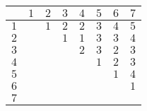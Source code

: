 \begin{tabular}{c|ccccccc}
\toprule
&$1$&$2$&$3$&$4$&$5$&$6$&$7$\\
\midrule
$1$&   &$1$&$2$&$2$&$3$&$4$&$5$\\
$2$&   &   &$1$&$1$&$3$&$3$&$4$\\
$3$&   &   &   &$2$&$3$&$2$&$3$\\
$4$&   &   &   &   &$1$&$2$&$3$\\
$5$&   &   &   &   &   &$1$&$4$\\
$6$&   &   &   &   &   &   &$1$\\
$7$&   &   &   &   &   &   &   \\
\bottomrule
\end{tabular}
